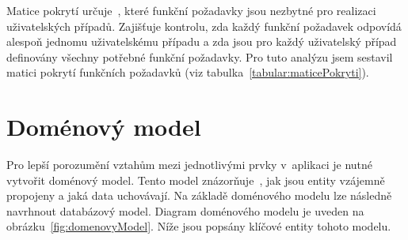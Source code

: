 Matice pokrytí určuje~\cite{uml_2007}, které funkční požadavky jsou nezbytné pro realizaci uživatelských případů. 
Zajišťuje kontrolu, zda každý funkční požadavek odpovídá alespoň jednomu uživatelskému případu a zda jsou pro každý uživatelský případ definovány všechny potřebné funkční požadavky. 
Pro tuto analýzu jsem sestavil matici pokrytí funkčních požadavků (viz tabulka~\ref{tabular:maticePokryti}).

\section{Doménový model}\label{text:analyza/datovymodel}

Pro lepší porozumění vztahům mezi jednotlivými prvky v~aplikaci je nutné vytvořit doménový model. 
Tento model znázorňuje~\cite{uml_2007}, jak jsou entity vzájemně propojeny a jaká data uchovávají. 
Na základě doménového modelu lze následně navrhnout databázový model. 
Diagram doménového modelu je uveden na obrázku~\ref{fig:domenovyModel}. 
Níže jsou popsány klíčové entity tohoto modelu.

